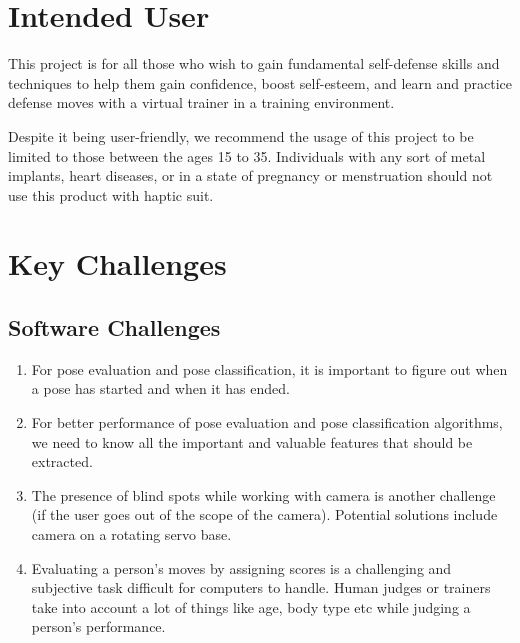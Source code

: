 \section{Intended User}

This project is for all those who wish to gain fundamental self-defense skills and techniques to help them gain confidence, boost self-esteem, and learn and practice defense moves with a virtual trainer in a training environment. 

Despite it being user-friendly, we recommend the usage of this project to be limited to those between the ages 15 to 35. Individuals with any sort of metal implants, heart diseases, or in a state of pregnancy or menstruation should not use this product with haptic suit.

\section{Key Challenges}

\subsection{Software Challenges}
\begin{enumerate}
  \item For pose evaluation and pose classification, it is important to figure out when a pose has started and when it has ended. 
  
  \item For better performance of pose evaluation and pose classification algorithms, we need to know all the important and valuable features that should be extracted.
  
  \item The presence of blind spots while working with camera is another challenge (if the user goes out of the scope of the camera). Potential solutions include camera on a rotating servo base.
  
  \item Evaluating a person’s moves by assigning scores is a challenging and subjective task difficult for computers to handle. Human judges or trainers take into account a lot of things like age, body type etc while judging a person's performance. 
  
\end{enumerate}
